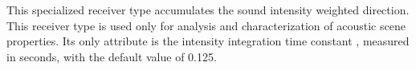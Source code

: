 This specialized receiver type accumulates the sound intensity
weighted direction. This receiver type is used only for analysis and
characterization of acoustic scene properties. Its only attribute is
the intensity integration time constant , measured in
seconds, with the default value of 0.125.
